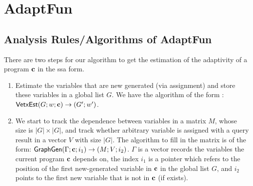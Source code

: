 \documentclass[a4paper,11pt]{article}
\newcommand{\THESYSTEM}{\textsf{AdaptFun}}
\begin{document}
\section{\THESYSTEM}
\subsection{Analysis Rules/Algorithms of \THESYSTEM}
%
There are two steps for our algorithm to get the estimation of the adaptivity of a program $\mathbf{{c}}$ in the ssa form. 
\begin{enumerate}
    \item Estimate the variables that are new generated (via assignment) and store these variables in a global list $G$. We have the algorithm of the form : $\mathsf{VetxEst}{( G;w; \mathbf{{c}})}\to {(G';w')} $.
    \item We start to track the dependence between variables in a matrix $M$, whose size is $|G| \times |G|$, and track whether arbitrary variable is assigned with a query result in a vector $V$ with size $|G|$. The algorithm to fill in the matrix is of the form: $\mathsf{GraphGen}{(\Gamma ; \mathbf{{c}} ; i_1)}\to {(M;V;{i_2})}$. $\Gamma$ is a vector records the variables the current program $\mathbf{{c}}$ depends on, the index $i_1$ is a pointer which refers to the position of the first new-generated variable in $\mathbf{{c}}$ in the global list $G$, and $i_2$ points to the first new variable that is not in $\mathbf{{c}}$ (if exists). 
\end{enumerate}
\end{document}
